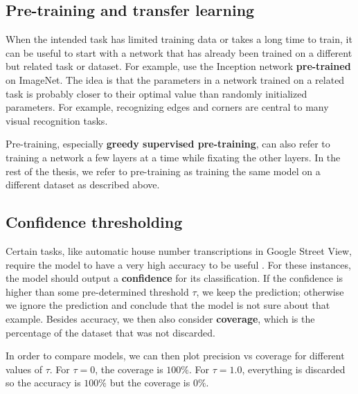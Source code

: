 \subsection{Pre-training and transfer learning}

When the intended task has limited training data or takes a long time to train, it can be useful to start with a network that has already been trained on a different but related task or dataset.
For example, \cite{SpatialTransformerNetworks} use the Inception network \textbf{pre-trained} on ImageNet.
The idea is that the parameters in a network trained on a related task is probably closer to their optimal value than randomly initialized parameters. For example, recognizing edges and corners are central to many visual recognition tasks.

Pre-training, especially \textbf{greedy supervised pre-training}, can also refer to training a network a few layers at a time while fixating the other layers. In the rest of the thesis, we refer to pre-training as training the same model on a different dataset as described above.


\subsection{Confidence thresholding}


Certain tasks, like automatic house number transcriptions in Google Street View, require the model to have a very high accuracy to be useful \cite{multidigit_streetview}.
For these instances, the model should output a \textbf{confidence} for its classification. If the confidence is higher than some pre-determined threshold $\tau$, we keep the prediction; otherwise we ignore the prediction and conclude that the model is not sure about that example.
Besides accuracy, we then also consider \textbf{coverage}, which is the percentage of the dataset that was not discarded.

In order to compare models, we can then plot precision vs coverage for different values of $\tau$. For $\tau=0$, the coverage is $100\%$. For $\tau=1.0$, everything is discarded so the accuracy is $100\%$ but the coverage is $0\%$.

